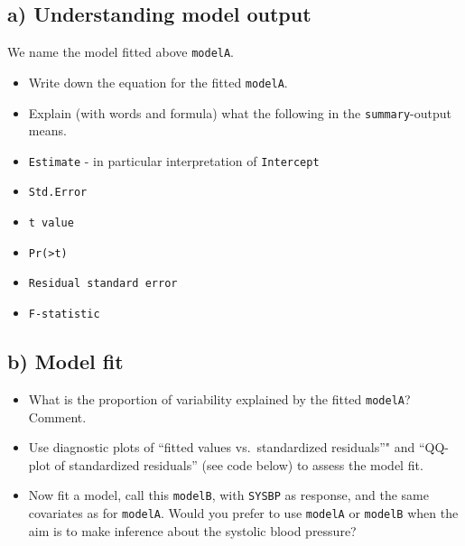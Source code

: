 \documentclass[]{article}
\providecommand{\tightlist}{%
  \setlength{\itemsep}{0pt}\setlength{\parskip}{0pt}}
\begin{document}
\subsection{a) Understanding model
output}\label{a-understanding-model-output}

We name the model fitted above \texttt{modelA}.

\begin{itemize}
\tightlist
\item
  Write down the equation for the fitted \texttt{modelA}.
\item
  Explain (with words and formula) what the following in the
  \texttt{summary}-output means.
\item
  \texttt{Estimate} - in particular interpretation of \texttt{Intercept}
\item
  \texttt{Std.Error}
\item
  \texttt{t\ value}
\item
  \texttt{Pr(\textgreater{}\textbar{}t\textbar{})}
\item
  \texttt{Residual\ standard\ error}
\item
  \texttt{F-statistic}
\end{itemize}

\subsection{b) Model fit}\label{b-model-fit}

\begin{itemize}
\tightlist
\item
  What is the proportion of variability explained by the fitted
  \texttt{modelA}? Comment.
\item
  Use diagnostic plots of ``fitted values vs.~standardized residuals''"
  and ``QQ-plot of standardized residuals'' (see code below) to assess
  the model fit.
\item
  Now fit a model, call this \texttt{modelB}, with \texttt{SYSBP} as
  response, and the same covariates as for \texttt{modelA}. Would you
  prefer to use \texttt{modelA} or \texttt{modelB} when the aim is to
  make inference about the systolic blood pressure?
\end{itemize}
\end{document}
